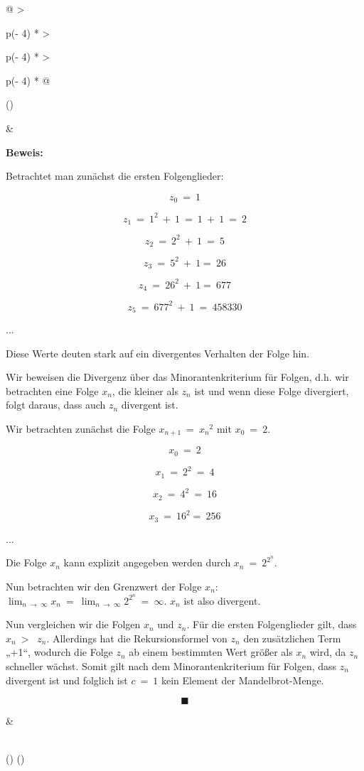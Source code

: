 \documentclass{book}
\begin{document}
\begin{longtable}[]{@{}
  >{\raggedright\arraybackslash}p{(\columnwidth - 4\tabcolsep) * }
  >{\raggedright\arraybackslash}p{(\columnwidth - 4\tabcolsep) * }
  >{\raggedright\arraybackslash}p{(\columnwidth - 4\tabcolsep) * }@{}}
\toprule()
\begin{minipage}[b]{\linewidth}\raggedright
\end{minipage} & \begin{minipage}[b]{\linewidth}\raggedright
\textbf{Beweis:}

Betrachtet man zunächst die ersten Folgenglieder:

\[z_{0}\  = \ 1\]

\[z_{1}\  = \ 1^{2}\  + \ 1\  = \ 1\  + \ 1\  = \ 2\]

\[z_{2}\  = \ 2^{2}\  + \ 1\  = \ 5\]

\[z_{3}\  = \ 5^{2}\  + \ 1 = \ 26\]

\[z_{4}\  = \ 26^{2}\  + \ 1 = \ 677\]

\[z_{5}\  = \ 677^{2}\  + \ 1\  = \ 458330\]

...

Diese Werte deuten stark auf ein divergentes Verhalten der Folge hin.

Wir beweisen die Divergenz über das Minorantenkriterium für Folgen, d.h.
wir betrachten eine Folge \(x_{n}\), die kleiner als \(z_{n}\) ist und
wenn diese Folge divergiert, folgt daraus, dass auch \(z_{n}\) divergent
ist.

Wir betrachten zunächst die Folge \(x_{n + 1}\  = \ {x_{n}}^{2}\) mit
\(x_{0}\  = \ 2\).

\[x_{0}\  = \ 2\]

\[x_{1}\  = \ 2^{2}\  = \ 4\]

\[x_{2}\  = \ 4^{2}\  = \ 16\]

\[x_{3}\  = \ 16^{2} = \ 256\]

...

Die Folge \(x_{n}\) kann explizit angegeben werden durch
\(x_{n}\  = \ 2^{2^{n}}\).

Nun betrachten wir den Grenzwert der Folge \(x_{n}\):
\(\lim_{n\  \rightarrow \ \infty}x_{n}\  = \ \lim_{n\  \rightarrow \ \infty}2^{2^{n}}\  = \ \infty\).
\(x_{n}\) ist also divergent.

Nun vergleichen wir die Folgen \(x_{n}\) und \(z_{n}\). Für die ersten
Folgenglieder gilt, dass \(x_{n}\  > \ \) \(z_{n}\). Allerdings hat die
Rekursionsformel von \(z_{n}\) den zusätzlichen Term „+1``, wodurch die
Folge \(z_{n}\) ab einem bestimmten Wert größer als \(x_{n}\) wird, da
\(z_{n}\) schneller wächst. Somit gilt nach dem Minorantenkriterium für
Folgen, dass \(z_{n}\) divergent ist und folglich ist \(c\  = \ 1\) kein
Element der Mandelbrot-Menge.

\[\blacksquare\]
\end{minipage} & \begin{minipage}[b]{\linewidth}\raggedright
\end{minipage} \\
\midrule()
\endhead
\bottomrule()
\end{longtable}
\end{document}
